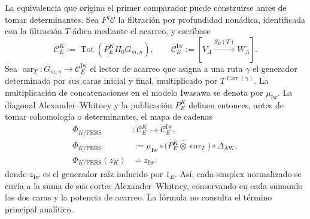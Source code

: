 La equivalencia que origina el primer comparador puede construirse antes de
tomar determinantes. Sea \(F^q\mathcal C\) la filtración por profundidad
nonádica, identificada con la filtración \(T\)-ádica mediante el acarreo, y
escríbase
\begin{equation}\label{eq:amp-bsd-complejos-kato-iwasawa}
 \mathcal C_E^K
 :=\operatorname{Tot}\!\left(
 P_E^K\widehat\Pi_0G_{m,n}\right),
 \qquad
 \mathcal C_E^{\mathrm{Iw}}
 :=[V_\Lambda\xrightarrow{S_E(T)}W_\Lambda].
\end{equation}
Sea
\(\operatorname{car}_T:G_{m,n}\to\mathcal C_E^{\mathrm{Iw}}\) el lector
de acarreo que asigna a una ruta \(\gamma\) el generador determinado por sus
caras inicial y final, multiplicado por
\(T^{\operatorname{Carr}(\gamma)}\). La multiplicación de concatenaciones en
el modelo Iwasawa se denota por \(\mu_{\mathrm{Iw}}\). La diagonal
Alexander--Whitney y la publicación \(P_E^K\) definen entonces, antes de
tomar cohomología o determinantes, el mapa de cadenas
\begin{equation}\label{eq:amp-bsd-phi-kato-fers}
\begin{aligned}
 \Phi_{K/\mathrm{FERS}}&:
 \mathcal C_E^K\longrightarrow\mathcal C_E^{\mathrm{Iw}},\\
 \Phi_{K/\mathrm{FERS}}
 &:=
 \mu_{\mathrm{Iw}}\circ
 \bigl(P_E^K\widehat\otimes\operatorname{car}_T\bigr)
 \circ\Delta_{\mathrm{AW}},\\
 \Phi_{K/\mathrm{FERS}}(z_K)&=z_{\mathrm{Iw}}.
\end{aligned}
\end{equation}
donde \(z_{\mathrm{Iw}}\) es el generador raíz inducido por \(1_E\). Así,
cada simplex normalizado se envía a la suma de sus cortes
Alexander--Whitney, conservando en cada sumando las dos caras y la potencia
de acarreo. La fórmula no consulta el término principal analítico.

